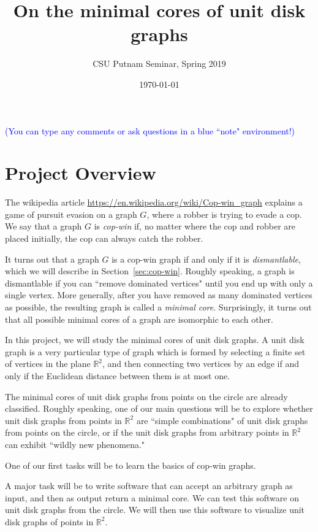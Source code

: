 \documentclass[amscd, amssymb, verbatim]{amsart}[12pt]
\newcommand{\note}[1]{\textcolor{blue}{({#1})}}
\theoremstyle{plain}
\theoremstyle{definition}
\newcommand{\R}{\mathbb{R}}
\begin{document}
\title{On the minimal cores of unit disk graphs}
\author{CSU Putnam Seminar, Spring 2019}
\date{\today}
\maketitle

\note{You can type any comments or ask questions in a blue ``note" environment!}


\section{Project Overview}

The wikipedia article \url{https://en.wikipedia.org/wiki/Cop-win\_graph} explains a game of pursuit evasion on a graph $G$, where a robber is trying to evade a cop. 
We say that a graph $G$ is \emph{cop-win} if, no matter where the cop and robber are placed initially, the cop can always catch the robber.

It turns out that a graph $G$ is a cop-win graph if and only if it is \emph{dismantlable}, which we will describe in Section~\ref{sec:cop-win}.
Roughly speaking, a graph is dismantlable if you can ``remove dominated vertices" until you end up with only a single vertex.
More generally, after you have removed as many dominated vertices as possible, the resulting graph is called a \emph{minimal core}. Surprisingly, it turns out that all possible minimal cores of a graph are isomorphic to each other.

In this project, we will study the minimal cores of unit disk graphs.
A unit disk graph is a very particular type of graph which is formed by selecting a finite set of vertices in the plane $\R^2$, and then connecting two vertices by an edge if and only if the Euclidean distance between them is at most one.

The minimal cores of unit disk graphs from points on the circle are already classified.
Roughly speaking, one of our main questions will be to explore whether unit disk graphs from points in $\R^2$ are ``simple combinations" of unit disk graphs from points on the circle, or if the unit disk graphs from arbitrary points in $\R^2$ can exhibit ``wildly new phenomena."

One of our first tasks will be to learn the basics of cop-win graphs.

A major task will be to write software that can accept an arbitrary graph as input, and then as output return a minimal core.
We can test this software on unit disk graphs from the circle.
We will then use this software to visualize unit disk graphs of points in $\R^2$.
\end{document}
